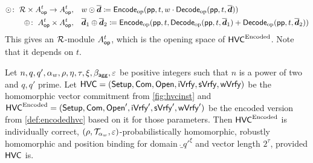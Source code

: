 \begin{align*}
 \odot\colon\;\mathcal{R}\times A_{\mathsf{op}}^{t}\to A_{\mathsf{op}}^{t},&\quad w\odot \overline{\boldsymbol{d}} \coloneqq \mathsf{Encode}_{\mathrm{op}}(\mathsf{pp},t, w\cdot\mathsf{Decode}_{\mathrm{op}}(\mathsf{pp}, t, \overline{\boldsymbol{d}}))\\
 \oplus\colon\;A_{\mathsf{op}}^{t}\times A_{\mathsf{op}}^{t},&\quad \overline{\boldsymbol{d}}_1 \oplus \overline{\boldsymbol{d}}_2 \coloneqq \mathsf{Encode}_{\mathrm{op}}(\mathsf{pp}, t, \mathsf{Decode}_{\mathrm{op}}(\mathsf{pp},t,\overline{\boldsymbol{d}}_1) + \mathsf{Decode}_{\mathrm{op}}(\mathsf{pp}, t,\overline{\boldsymbol{d}}_2))
\end{align*}
This gives an $\mathcal{R}$-module $A_{\mathsf{op}}^{t}$, which is the opening space of $\mathsf{HVC}^{\textrm{Encoded}}$.
Note that it depends on $t$.

\begin{theorem}\label{thm:encodedhvcworks}
Let $n, q, q',\alpha_w,\rho, \eta, \tau, \xi, \beta_{\mathsf{agg}}, \varepsilon$ be positive integers such that $n$ is a power of two and $q,q'$ prime.
Let $\mathsf{HVC} = (\mathsf{Setup},\mathsf{Com},\mathsf{Open},\mathsf{iVrfy},\mathsf{sVrfy}, \mathsf{wVrfy})$ be the homomorphic vector commitment from \autoref{fig:hvcinst} and $\mathsf{HVC}^{\textrm{Encoded}} = (\mathsf{Setup},\mathsf{Com},\mathsf{Open}',\mathsf{iVrfy}',\mathsf{sVrfy}', \mathsf{wVrfy}')$ be the encoded version from \autoref{def:encodedhvc} based on it for those parameters.
Then $\mathsf{HVC}^{\textrm{Encoded}}$ is individually correct, $(\rho,\mathcal{T}_{\alpha_w},\varepsilon)$-probabilistically homomorphic, robustly homomorphic and position binding for domain $\ring_{q'}^\xi$ and vector length $2^\tau$, provided $\mathsf{HVC}$ is.
\end{theorem}
